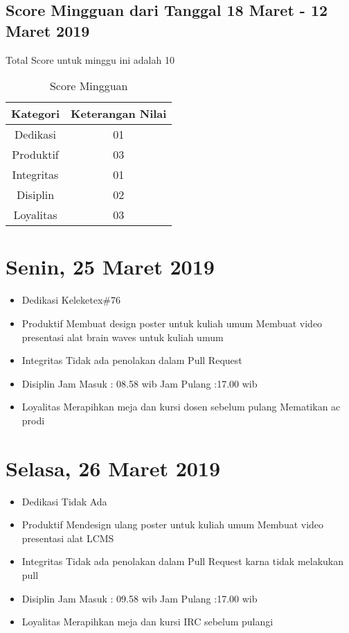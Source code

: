\subsection{Score Mingguan dari Tanggal 18 Maret - 12 Maret 2019}
Total Score untuk minggu ini adalah 10

\begin{table}[h]
\caption{Score Mingguan}
\centering
\begin{tabular}{|c|c|}
\hline
\textbf{Kategori}&\textbf{Keterangan Nilai}\\
\hline
Dedikasi&01\\
\hline
Produktif&03\\
\hline
Integritas&01\\
\hline
Disiplin&02\\
\hline
Loyalitas&03\\
\hline
\end{tabular}
\label{table:score mingguan}
\end{table}

\section{Senin, 25 Maret 2019}
\begin{itemize}
\item Dedikasi
\subitem Keleketex\#76
\item Produktif
  \subitem Membuat design poster untuk kuliah umum
  \subitem Membuat video presentasi alat brain waves untuk kuliah umum
\item Integritas
  \subitem Tidak ada penolakan dalam Pull Request
\item Disiplin
  \subitem Jam Masuk : 08.58 wib
  \subitem Jam Pulang :17.00 wib
\item Loyalitas
  \subitem Merapihkan meja dan kursi dosen sebelum pulang
  \subitem Mematikan ac prodi
\end{itemize}

\section{Selasa, 26 Maret 2019}
\begin{itemize}
\item Dedikasi
\subitem Tidak Ada
\item Produktif
  \subitem Mendesign ulang poster untuk kuliah umum
  \subitem Membuat video presentasi alat LCMS
\item Integritas
  \subitem Tidak ada penolakan dalam Pull Request karna tidak melakukan pull
\item Disiplin
  \subitem Jam Masuk : 09.58 wib
  \subitem Jam Pulang :17.00 wib
\item Loyalitas
  \subitem Merapihkan meja dan kursi IRC sebelum pulangi
\end{itemize}

